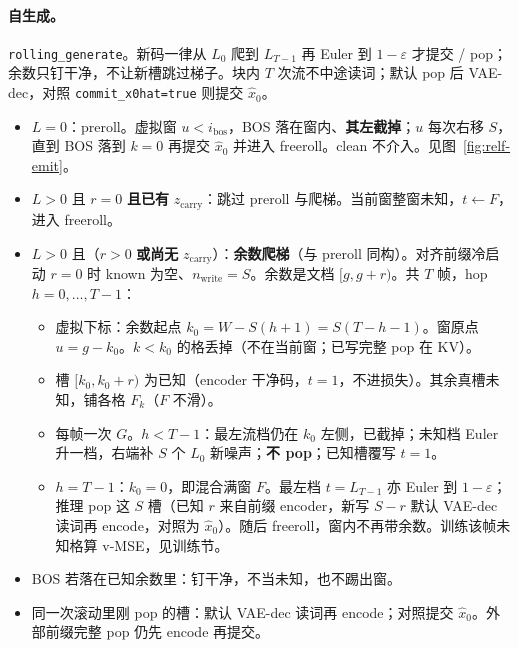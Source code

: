 \documentclass[UTF8,a4paper,11pt]{ctexart}
\begin{document}
\paragraph{自生成。}
\texttt{rolling\_generate}。新码一律从 \(L_0\) 爬到 \(L_{T-1}\) 再 Euler 到 \(1-\varepsilon\) 才提交 / pop；余数只钉干净，不让新槽跳过梯子。块内 \(T\) 次流不中途读词；默认 pop 后 VAE-dec，对照 \texttt{commit\_x0hat=true} 则提交 \(\hat x_0\)。
\begin{itemize}
  \item \(L=0\)：preroll。虚拟窗 \(u<i_{\mathrm{bos}}\)，BOS 落在窗内、\textbf{其左截掉}；\(u\) 每次右移 \(S\)，直到 BOS 落到 \(k=0\) 再提交 \(\hat x_0\) 并进入 freeroll。clean 不介入。见图~\ref{fig:relf-emit}。
  \item \(L>0\) 且 \(r=0\) \textbf{且已有} \(z_{\mathrm{carry}}\)：跳过 preroll 与爬梯。当前窗整窗未知，\(t\leftarrow F\)，进入 freeroll。
  \item \(L>0\) 且（\(r>0\) \textbf{或尚无} \(z_{\mathrm{carry}}\)）：\textbf{余数爬梯}（与 preroll 同构）。对齐前缀冷启动 \(r=0\) 时 known 为空、\(n_{\mathrm{write}}=S\)。余数是文档 \([g,g+r)\)。共 \(T\) 帧，hop \(h=0,\ldots,T-1\)：
  \begin{itemize}
    \item 虚拟下标：余数起点 \(k_0=W-S(h+1)=S(T-h-1)\)。窗原点 \(u=g-k_0\)。\(k<k_0\) 的格丢掉（不在当前窗；已写完整 pop 在 KV）。
    \item 槽 \([k_0,k_0+r)\) 为已知（encoder 干净码，\(t=1\)，不进损失）。其余真槽未知，铺各格 \(F_k\)（\(F\) 不滑）。
    \item 每帧一次 \(G\)。\(h<T-1\)：最左流档仍在 \(k_0\) 左侧，已截掉；未知档 Euler 升一档，右端补 \(S\) 个 \(L_0\) 新噪声；\textbf{不 pop}；已知槽覆写 \(t=1\)。
    \item \(h=T-1\)：\(k_0=0\)，即混合满窗 \(F\)。最左档 \(t=L_{T-1}\) 亦 Euler 到 \(1-\varepsilon\)；推理 pop 这 \(S\) 槽（已知 \(r\) 来自前缀 encoder，新写 \(S-r\) 默认 VAE-dec 读词再 encode，对照为 \(\hat x_0\)）。随后 freeroll，窗内不再带余数。训练该帧未知格算 v-MSE，见训练节。
  \end{itemize}
  \item BOS 若落在已知余数里：钉干净，不当未知，也不踢出窗。
  \item 同一次滚动里刚 pop 的槽：默认 VAE-dec 读词再 encode；对照提交 \(\hat x_0\)。外部前缀完整 pop 仍先 encode 再提交。
\end{itemize}
\end{document}
